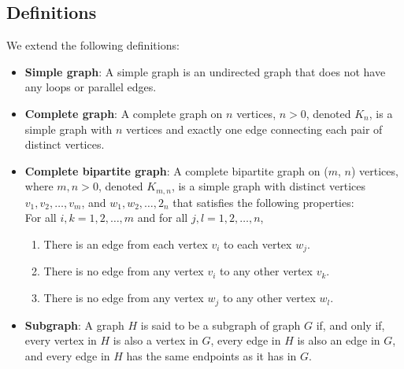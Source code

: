 \documentclass[a4paper]{article}
\begin{document}
\subsection{Definitions}
We extend the following definitions:
\begin{itemize}
	\item[] \textbf{Simple graph}: A simple graph is an undirected graph that does not have any loops or parallel edges.
	\item[] \textbf{Complete graph}: A complete graph on $n$ vertices, $n>0$, denoted $K_n$, is a simple graph with $n$ vertices and exactly one edge connecting each pair of distinct vertices.
	\item[] \textbf{Complete bipartite graph}: A complete bipartite graph on ($m$, $n$) vertices, where $m,n>0$, denoted $K_{m,n}$, is a simple graph with distinct vertices $v_1, v_2,\dots,v_m$, and $w_1,w_2,\dots,2_n$ that satisfies the following properties:\\
	For all $i,k=1,2,\dots,m$ and for all $j,l=1,2,\dots,n$,
	\begin{enumerate}
		\item There is an edge from each vertex $v_i$ to each vertex $w_j$.
		\item There is no edge from any vertex $v_i$ to any other vertex $v_k$.
		\item There is no edge from any vertex $w_j$ to any other vertex $w_l$.
	\end{enumerate}
	\item[] \textbf{Subgraph}: A graph $H$ is said to be a subgraph of graph $G$ if, and only if, every vertex in $H$ is also a vertex in $G$, every edge in $H$ is also an edge in $G$, and every edge in $H$ has the same endpoints as it has in $G$.
\end{itemize}
\end{document}
